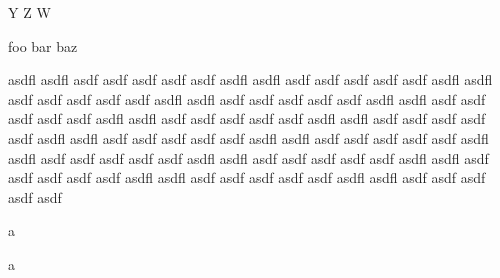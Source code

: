 \documentclass{article}
\begin{document}
\def\aaa{}
\def\yyy{Y}
\def\zzz{Z}
\def\www{W}
\def\xxx#1#2#3{ #1 #2 #3}
\xxx\yyy\zzz\www

foo bar baz

asdfl asdfl asdf asdf asdf asdf asdf
asdfl asdfl asdf asdf asdf asdf asdf
asdfl asdfl asdf asdf asdf asdf asdf
asdfl asdfl asdf asdf asdf asdf asdf
asdfl asdfl asdf asdf asdf asdf asdf
asdfl asdfl asdf asdf asdf asdf asdf
asdfl asdfl asdf asdf asdf asdf asdf
asdfl asdfl asdf asdf asdf asdf asdf
asdfl asdfl asdf asdf asdf asdf asdf
asdfl asdfl asdf asdf asdf asdf asdf
asdfl asdfl asdf asdf asdf asdf asdf
asdfl asdfl asdf asdf asdf asdf asdf
asdfl asdfl asdf asdf asdf asdf asdf
asdfl asdfl asdf asdf asdf asdf asdf%

a

a

\end{document}

